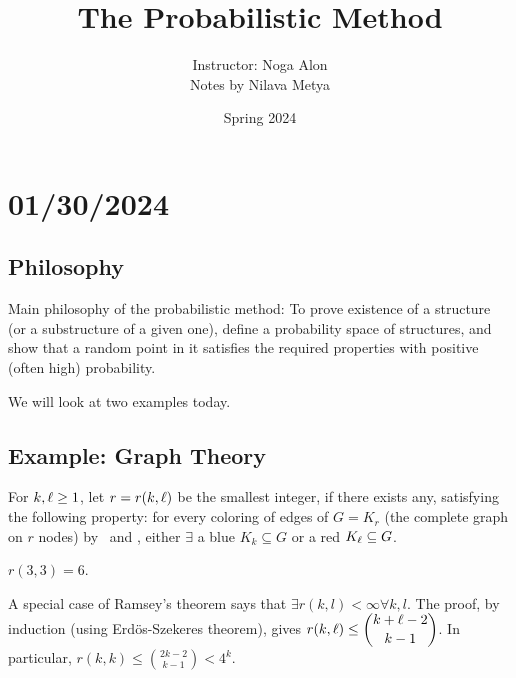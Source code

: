 
\newcommand{\eto}{\stackrel{=}{\to}}
\selectfont 
\usepackage[
backend=biber,
style=alphabetic,%
citestyle=ieee-alphabetic,
maxnames=10,
sorting=ynt
]{biblatex}

\title{The Probabilistic Method}
\usepackage{quiver}
\author{Instructor: Noga Alon\\Notes by Nilava Metya}
\date{Spring 2024}
\makeatletter
\renewcommand{\@chapapp}{Lecture}
\makeatother



\maketitle
\tableofcontents

\chapter{01/30/2024}

\section{Philosophy}
Main philosophy of the probabilistic method: To prove existence of a structure (or a substructure of a given one), define a probability space of structures, and show that a random point in it satisfies the required properties with positive (often high) probability.

We will look at two examples today.

\section{Example: Graph Theory}

\begin{defn}
For $k,\ell\geq 1$, let $r=r(k,\ell)$ be the smallest integer, if there exists any, satisfying the following property: for every coloring of edges of $G=K_r$ (the complete graph on $r$ nodes) by \red~and \blue, either $\exists$ a  blue $K_k\subseteq G$ or a red $K_{\ell}\subseteq G$.
\end{defn}
\begin{ex}
$r(3,3)=6$.
\end{ex}

A special case of Ramsey's theorem says that $\exists r(k,l)<\infty\forall k,l$. The proof, by induction (using Erd\"os-Szekeres theorem), gives $\displaystyle r(k,\ell)\leq\binom{k+\ell-2}{k-1}$. In particular, $r(k,k) \leq \binom{2k-2}{k-1} <4^k$.

